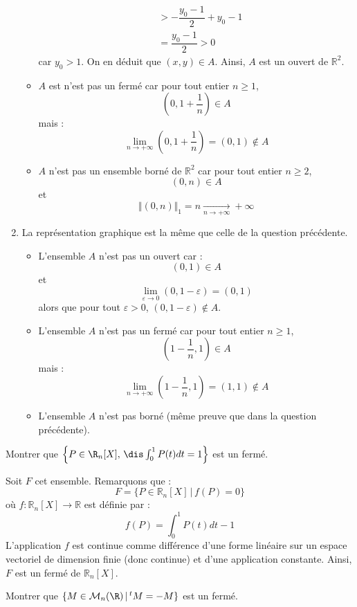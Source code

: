 \documentclass[a4paper,10pt]{report}
\begin{document}
\begin{enumerate}
\begin{itemize}
\begin{align*}
& > - \dfrac{y_0-1}{2} + y_0-1 \\
& = \dfrac{y_0-1}{2}>0
\end{align*}
car $y_0>1$. On en déduit que $(x,y) \in A$. Ainsi, $A$ est un ouvert de $\mathbb{R}^2$.
\item $A$ est n'est pas un fermé car pour tout entier $n \geq 1$,
$$ \left(0,1+ \dfrac{1}{n} \right) \in A$$
mais :
$$ \lim_{n \rightarrow + \infty} \left(0,1 + \dfrac{1}{n}\right) = (0,1) \notin A$$
\item $A$ n'est pas un ensemble borné de $\mathbb{R}^2$ car pour tout entier $n \geq 2$,
$$ (0,n) \in A$$
et 
$$ \Vert (0,n) \Vert_1 = n \underset{n \rightarrow + \infty}{\longrightarrow} + \infty$$
\end{itemize}
\item La représentation graphique est la même que celle de la question précédente. 
\begin{itemize}
\item L'ensemble $A$ n'est pas un ouvert car :
$$ (0,1) \in A$$
et 
$$ \lim_{\varepsilon \rightarrow 0} (0,1- \varepsilon) = (0,1)$$
alors que pour tout $\varepsilon>0$, $(0,1- \varepsilon) \notin A$. 
\item L'ensemble $A$ n'est pas un fermé car  pour tout entier $n \geq 1$,
$$ \left(1- \dfrac{1}{n},1\right) \in A$$
mais :
$$ \lim_{n \rightarrow + \infty} \left(1- \dfrac{1}{n},1\right) = (1,1) \notin A$$
\item L'ensemble $A$ n'est pas borné (même preuve que dans la question précédente).
\end{itemize}
\end{enumerate}

\begin{Exa} Montrer que $\left\{P\in\R_n[X], \, \dis\int_0^1P(t)dt= 1\right\}$ est un fermé.
\end{Exa}

\corr Soit $F$ cet ensemble. Remarquons que :
$$ F = \lbrace P \in \mathbb{R}_n[X] \, \vert \, f(P)=0 \rbrace$$
où $f: \mathbb{R}_n[X] \rightarrow \mathbb{R}$ est définie par :
$$ f(P)= \int_0^1P(t)dt-1$$
L'application $f$ est continue comme différence d'une forme linéaire sur un espace vectoriel de dimension finie (donc continue) et d'une application constante. Ainsi, $F$ est un fermé de $\mathbb{R}_n[X]$.

\begin{Exa} Montrer que $\{M\in{\cal M}_n(\R) \, \vert \,  ^tM=-M\}$ est un fermé.
\end{Exa}
\end{document}
